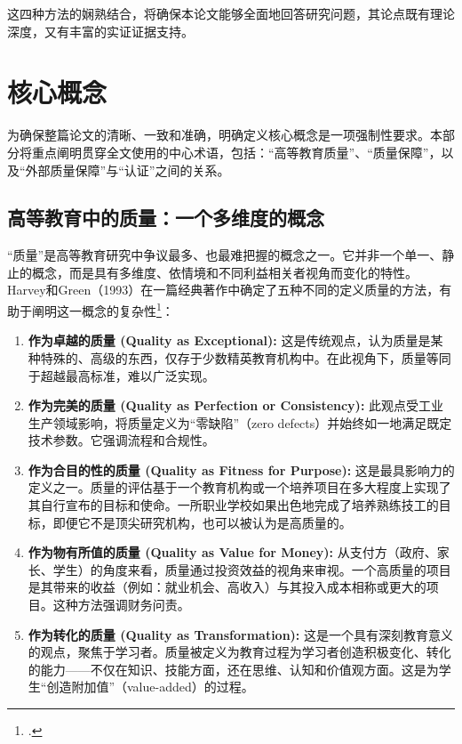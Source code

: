 这四种方法的娴熟结合，将确保本论文能够全面地回答研究问题，其论点既有理论深度，又有丰富的实证证据支持。



\section{核心概念}
\label{sec:khai_niem_cot_loi}

为确保整篇论文的清晰、一致和准确，明确定义核心概念是一项强制性要求。本部分将重点阐明贯穿全文使用的中心术语，包括：“高等教育质量”、“质量保障”，以及“外部质量保障”与“认证”之间的关系。

\subsection{高等教育中的质量：一个多维度的概念}
\label{subsec:khai_niem_chat_luong}

“质量”是高等教育研究中争议最多、也最难把握的概念之一。它并非一个单一、静止的概念，而是具有多维度、依情境和不同利益相关者视角而变化的特性。Harvey和Green（1993）在一篇经典著作中确定了五种不同的定义质量的方法，有助于阐明这一概念的复杂性\footcite{HarveyGreen1993}：

\begin{enumerate}
    \item \textbf{作为卓越的质量 (Quality as Exceptional):} 这是传统观点，认为质量是某种特殊的、高级的东西，仅存于少数精英教育机构中。在此视角下，质量等同于超越最高标准，难以广泛实现。
    
    \item \textbf{作为完美的质量 (Quality as Perfection or Consistency):} 此观点受工业生产领域影响，将质量定义为“零缺陷”（zero defects）并始终如一地满足既定技术参数。它强调流程和合规性。
    
    \item \textbf{作为合目的性的质量 (Quality as Fitness for Purpose):} 这是最具影响力的定义之一。质量的评估基于一个教育机构或一个培养项目在多大程度上实现了其自行宣布的目标和使命。一所职业学校如果出色地完成了培养熟练技工的目标，即便它不是顶尖研究机构，也可以被认为是高质量的。
    
    \item \textbf{作为物有所值的质量 (Quality as Value for Money):} 从支付方（政府、家长、学生）的角度来看，质量通过投资效益的视角来审视。一个高质量的项目是其带来的收益（例如：就业机会、高收入）与其投入成本相称或更大的项目。这种方法强调财务问责。
    
    \item \textbf{作为转化的质量 (Quality as Transformation):} 这是一个具有深刻教育意义的观点，聚焦于学习者。质量被定义为教育过程为学习者创造积极变化、转化的能力——不仅在知识、技能方面，还在思维、认知和价值观方面。这是为学生“创造附加值”（value-added）的过程。
\end{enumerate}

